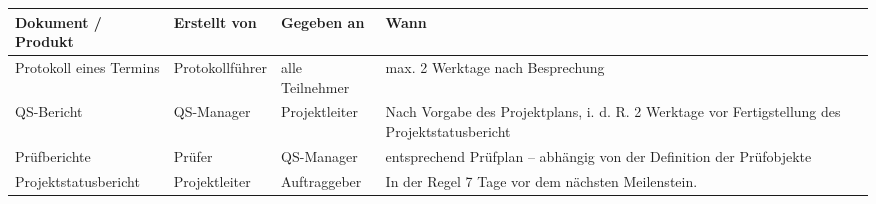 \begin{tabularx}{\textwidth}{| >{\scriptsize}X | >{\scriptsize}l | >{\scriptsize}l | >{\scriptsize}p{7cm} |}
    \hline
    \rowcolor{lightgray} 
    Dokument / Produkt & Erstellt von & Gegeben an & Wann \\ \hline
    Protokoll eines Termins & Protokollführer & alle Teilnehmer & max. 2 Werktage nach Besprechung \\ \hline
    QS-Bericht & QS-Manager & Projektleiter & Nach Vorgabe des Projektplans, i. d. R. 2 Werktage vor Fertigstellung des Projektstatusbericht \\ \hline
    Prüfberichte & Prüfer & QS-Manager & entsprechend Prüfplan – abhängig von der Definition der Prüfobjekte \\ \hline
    Projektstatusbericht & Projektleiter & Auftraggeber & In der Regel 7 Tage vor dem nächsten Meilenstein. \\ \hline
\end{tabularx}
